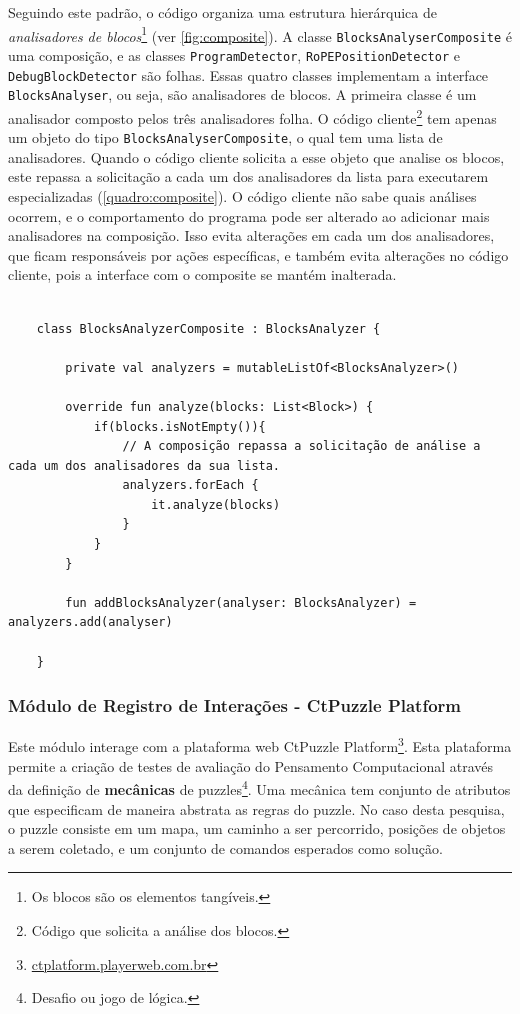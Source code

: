 Seguindo este padrão, o código organiza uma estrutura hierárquica de \textit{analisadores de blocos}\footnote{Os blocos são os elementos tangíveis.} (ver \autoref{fig:composite}). A classe \texttt{BlocksAnalyserComposite} é uma composição, e as classes \texttt{ProgramDetector}, \texttt{RoPEPositionDetector} e \texttt{DebugBlockDetector} são folhas. Essas quatro classes implementam a interface \texttt{BlocksAnalyser}, ou seja, são analisadores de blocos. A primeira classe é um analisador composto pelos três analisadores folha.
O código cliente\footnote{Código que solicita a análise dos blocos.} tem apenas um objeto do tipo \texttt{BlocksAnalyserComposite}, o qual tem uma lista de analisadores. Quando o código cliente solicita a esse objeto que analise os blocos, este repassa a solicitação a cada um dos analisadores da lista para executarem especializadas (\autoref{quadro:composite}). O código cliente não sabe quais análises ocorrem, e o comportamento do programa pode ser alterado ao adicionar mais analisadores na composição. Isso evita alterações em cada um dos analisadores, que ficam responsáveis por ações específicas, e também evita alterações no código cliente, pois a interface com o composite se mantém inalterada.

\begin{quadro}[!h]
    \begin{verbatim}
    
    class BlocksAnalyzerComposite : BlocksAnalyzer {

        private val analyzers = mutableListOf<BlocksAnalyzer>()

        override fun analyze(blocks: List<Block>) {
            if(blocks.isNotEmpty()){
                // A composição repassa a solicitação de análise a cada um dos analisadores da sua lista.
                analyzers.forEach {
                    it.analyze(blocks)
                }
            }
        }

        fun addBlocksAnalyzer(analyser: BlocksAnalyzer) = analyzers.add(analyser)
        
    }
    \end{verbatim}
    \label{quadro:composite}
\end{quadro}

\subsubsection{Módulo de Registro de Interações - CtPuzzle Platform}
\label{sec:ctpuzzle}
Este módulo interage com a plataforma web CtPuzzle Platform\footnote{\url{ctplatform.playerweb.com.br}}. Esta plataforma permite a criação de testes de avaliação do Pensamento Computacional através da definição de \textbf{mecânicas} de puzzles\footnote{Desafio ou jogo de lógica.}. Uma mecânica tem conjunto de atributos que especificam de maneira abstrata as regras do puzzle. No caso desta pesquisa, o puzzle consiste em um mapa, um caminho a ser percorrido, posições de objetos a serem coletado, e um conjunto de comandos esperados como solução. 

